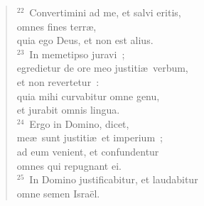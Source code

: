 \begin{verse}
${}^{22}$~Convertimini ad me, et salvi eritis,\\ omnes fines terr\ae ,\\ quia ego Deus, et non est alius.\\
${}^{23}$~In memetipso juravi~;\\ egredietur de ore meo justiti\ae\ verbum,\\ et non revertetur~:\\ quia mihi curvabitur omne genu,\\ et jurabit omnis lingua.\\
${}^{24}$~Ergo in Domino, dicet,\\ me\ae\ sunt justiti\ae\ et imperium~;\\ ad eum venient, et confundentur\\ omnes qui repugnant ei.\\
${}^{25}$~In Domino justificabitur, et laudabitur\\ omne semen Isra\"el.\end{verse}


